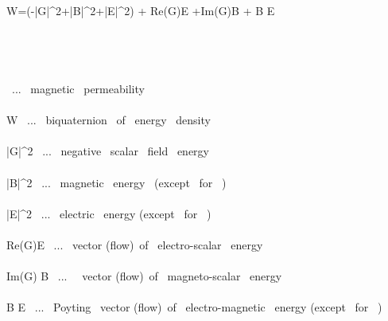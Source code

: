 \mu  \widehat W=(-|G|^2+|\vec B|^2+|\vec E|^2) +\imath {} Re(G)\vec E +\imath Im(G)\vec B + \imath {} \vec B \times \vec E \\\\\\

\\\\

\mu \ ... \ magnetic \ permeability \\\\
\widehat W \ ... \ biquaternion \ of \ energy \ density \\\\
|G|^2 \ ... \  negative \ scalar \ field \ energy \\\\
|\vec B|^2 \ ... \ magnetic \ energy \ (except \ for \ \mu) \\\\
|\vec E|^2 \ ... \ electric \ energy (except \ for \ \mu) \\\\
 Re(G)\vec E \ ... \ vector (flow)\ of \ electro-scalar \ energy \\\\
Im(G) \vec B \ ... \ \ vector (flow)\ of \ magneto-scalar \ energy \\\\
 \vec B \times \vec E \ ... \ Poyting \ vector (flow)\ of \ electro-magnetic \ energy (except \ for \ \mu)
